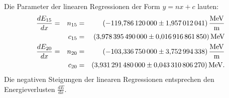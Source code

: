 Die Parameter der linearen Regressionen der Form $y=nx+c$ lauten:
\begin{align*}
  \frac{dE_{\text{15}}}{dx}   &=& n_{\text{15}} &=& \SI{-119.78612 \pm 1.957012041}{\frac{MeV}{m}}\\
                              & & c_{\text{15}} &=& \SI{ 3.97839549 \pm 0.016916861850}{MeV}\\
  \frac{dE_{\text{20}}}{dx}   &=& n_{\text{20}} &=& \SI{-103.33675 \pm 3.752994338}{\frac{MeV}{m}}\\
                              & & c_{\text{20}} &=& \SI{ 3.93129148 \pm 0.043310806270}{MeV}.\\
\end{align*}
Die negativen Steigungen der linearen Regressionen entsprechen den Energieverlusten $\frac{dE}{dx}$.

\FloatBarrier

